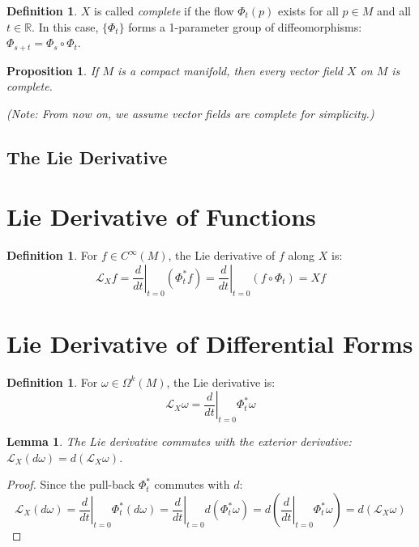 \documentclass[11pt, a4paper]{article}
\theoremstyle{plain}
\newtheorem{lemma}[theorem]{Lemma}
\newtheorem{proposition}[theorem]{Proposition}
\theoremstyle{definition}
\newtheorem{definition}[theorem]{Definition}
\theoremstyle{remark}
\begin{document}
\begin{definition}
$X$ is called \emph{complete} if the flow $\Phi_t(p)$ exists for all $p \in M$ and all $t \in \mathbb{R}$. In this case, $\{\Phi_t\}$ forms a 1-parameter group of diffeomorphisms: $\Phi_{s+t} = \Phi_s \circ \Phi_t$.
\end{definition}

\begin{proposition}
If $M$ is a compact manifold, then every vector field $X$ on $M$ is complete. 
\end{proposition}
\textit{(Note: From now on, we assume vector fields are complete for simplicity.)}

\subsection{The Lie Derivative}

\section*{Lie Derivative of Functions}
\begin{definition}
For $f \in C^\infty(M)$, the Lie derivative of $f$ along $X$ is:
\[
\mathcal{L}_X f = \left. \frac{d}{dt} \right|_{t=0} (\Phi_t^* f) = \left. \frac{d}{dt} \right|_{t=0} (f \circ \Phi_t) = Xf
\]
\end{definition}

\section*{Lie Derivative of Differential Forms}
\begin{definition}
For $\omega \in \Omega^k(M)$, the Lie derivative is:
\[
\mathcal{L}_X \omega = \left. \frac{d}{dt} \right|_{t=0} \Phi_t^* \omega
\]
\end{definition}

\begin{lemma}
The Lie derivative commutes with the exterior derivative: $\mathcal{L}_X (d\omega) = d(\mathcal{L}_X \omega)$.
\end{lemma}
\begin{proof}
Since the pull-back $\Phi_t^*$ commutes with $d$:
\[
\mathcal{L}_X (d\omega) = \left. \frac{d}{dt} \right|_{t=0} \Phi_t^*(d\omega) = \left. \frac{d}{dt} \right|_{t=0} d(\Phi_t^* \omega) = d \left( \left. \frac{d}{dt} \right|_{t=0} \Phi_t^* \omega \right) = d(\mathcal{L}_X \omega)
\]
\end{proof}
\end{document}
